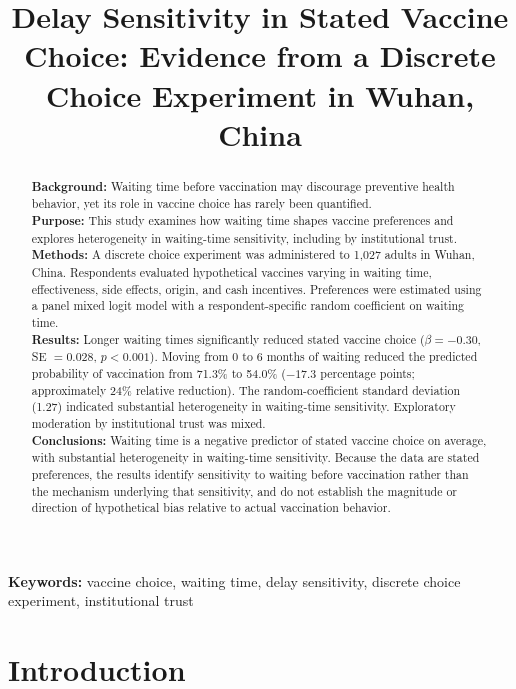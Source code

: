 \documentclass[12pt]{article}
\begin{document}
\title{Delay Sensitivity in Stated Vaccine Choice: Evidence from a Discrete Choice Experiment in Wuhan, China}
\date{}
\maketitle
\vspace{-1.5em}

\begin{abstract}
\noindent
\textbf{Background:} Waiting time before vaccination may discourage preventive health behavior, yet its role in vaccine choice has rarely been quantified. \\
\textbf{Purpose:} This study examines how waiting time shapes vaccine preferences and explores heterogeneity in waiting-time sensitivity, including by institutional trust. \\
\textbf{Methods:} A discrete choice experiment was administered to 1,027 adults in Wuhan, China. Respondents evaluated hypothetical vaccines varying in waiting time, effectiveness, side effects, origin, and cash incentives. Preferences were estimated using a panel mixed logit model with a respondent-specific random coefficient on waiting time. \\
\textbf{Results:} Longer waiting times significantly reduced stated vaccine choice ($\beta = -0.30$, SE $= 0.028$, $p < 0.001$). Moving from 0 to 6 months of waiting reduced the predicted probability of vaccination from 71.3\% to 54.0\% ($-17.3$ percentage points; approximately 24\% relative reduction). The random-coefficient standard deviation (1.27) indicated substantial heterogeneity in waiting-time sensitivity. Exploratory moderation by institutional trust was mixed. \\
\textbf{Conclusions:} Waiting time is a negative predictor of stated vaccine choice on average, with substantial heterogeneity in waiting-time sensitivity. Because the data are stated preferences, the results identify sensitivity to waiting before vaccination rather than the mechanism underlying that sensitivity, and do not establish the magnitude or direction of hypothetical bias relative to actual vaccination behavior.
\end{abstract}

\noindent\textbf{Keywords:} vaccine choice, waiting time, delay sensitivity, discrete choice experiment, institutional trust

\clearpage

\section{Introduction}
\end{document}

